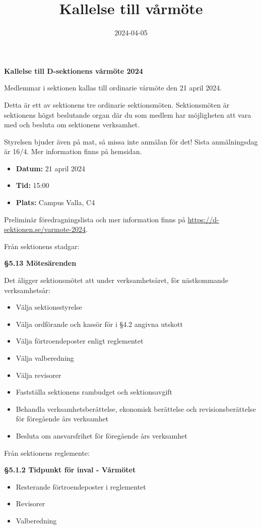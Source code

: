 \documentclass{datateknologsektionen-document}
\title{Kallelse till vårmöte}
\date{2024-04-05}
\begin{document}





\large
\begin{center}
  \vspace*{5mm}
  {\LARGE\bfseries Kallelse till D-sektionens vårmöte 2024}
  \vspace{2mm}
\end{center}

Medlemmar i sektionen kallas till ordinarie vårmöte den 21 april 2024. 

Detta är ett av sektionens tre ordinarie sektionsmöten. Sektionsmöten är sektionens högst beslutande organ där du som medlem har möjligheten att vara med och besluta om sektionens verksamhet. 

Styrelsen bjuder även på mat, så missa inte anmälan för det! Sista anmälningsdag är 16/4. Mer information finns på hemsidan.

\vspace*{4mm}
\begin{itemize}
  \item \textbf{Datum:} 21 april 2024
  \item \textbf{Tid:} 15:00
  \item \textbf{Plats:} Campus Valla, C4
  \vspace*{4mm}
\end{itemize}

Preliminär föredragningslista och mer information finns på \url{https://d-sektionen.se/varmote-2024}.


Från sektionens stadgar:

\textbf{§5.13 Mötesärenden}

Det åligger sektionsmötet att under verksamhetsåret, för nästkommande verksamhetsår:
\begin{itemize}
  \item Välja sektionsstyrelse
  \item Välja ordförande och kassör för i §4.2 angivna utskott
  \item Välja förtroendeposter enligt reglementet
  \item Välja valberedning
  \item Välja revisorer
  \item Fastställa sektionens rambudget och sektionsavgift
  \item Behandla verksamhetsberättelse, ekonomisk berättelse och revisionsberättelse för föregående års verksamhet
\item Besluta om ansvarsfrihet för föregående års verksamhet
\end{itemize}

Från sektionens reglemente:

\textbf{§5.1.2 Tidpunkt för inval - Vårmötet}
\begin{itemize}
  \item Resterande förtroendeposter i reglementet
  \item Revisorer
  \item Valberedning
\end{itemize}
\end{document}
